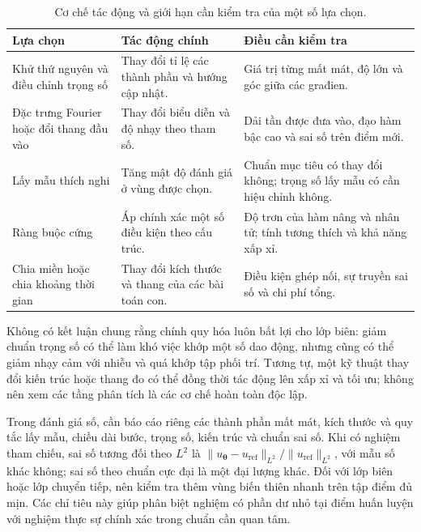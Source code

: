 \begin{table}[htbp]
\centering\small
\caption{Cơ chế tác động và giới hạn cần kiểm tra của một số lựa chọn.}
\label{p4:tab:remedies}
\begin{tabularx}{\textwidth}{@{}>{\raggedright\arraybackslash}p{}>{\raggedright\arraybackslash}X>{\raggedright\arraybackslash}X@{}}
\toprule
\textbf{Lựa chọn}&\textbf{Tác động chính}&\textbf{Điều cần kiểm tra}\\
\midrule
Khử thứ nguyên và điều chỉnh trọng số&
Thay đổi tỉ lệ các thành phần và hướng cập nhật.&
Giá trị từng mất mát, độ lớn và góc giữa các građien.\\
\addlinespace
Đặc trưng Fourier hoặc đổi thang đầu vào&
Thay đổi biểu diễn và độ nhạy theo tham số.&
Dải tần được đưa vào, đạo hàm bậc cao và sai số trên điểm mới.\\
\addlinespace
Lấy mẫu thích nghi&
Tăng mật độ đánh giá ở vùng được chọn.&
Chuẩn mục tiêu có thay đổi không; trọng số lấy mẫu có cần hiệu chỉnh không.\\
\addlinespace
Ràng buộc cứng&
Áp chính xác một số điều kiện theo cấu trúc.&
Độ trơn của hàm nâng và nhân tử; tính tương thích và khả năng xấp xỉ.\\
\addlinespace
Chia miền hoặc chia khoảng thời gian&
Thay đổi kích thước và thang của các bài toán con.&
Điều kiện ghép nối, sự truyền sai số và chi phí tổng.\\
\bottomrule
\end{tabularx}
\end{table}

Không có kết luận chung rằng chính quy hóa luôn bất lợi cho lớp
biên: giảm chuẩn trọng số có thể làm khó việc khớp một số dao động,
nhưng cũng có thể giảm nhạy cảm với nhiễu và quá khớp tập phối trí.
Tương tự, một kỹ thuật thay đổi kiến trúc hoặc thang đo có thể đồng
thời tác động lên xấp xỉ và tối ưu; không nên xem các tầng phân tích
là các cơ chế hoàn toàn độc lập.

Trong đánh giá số, cần báo cáo riêng các thành phần mất mát, kích
thước và quy tắc lấy mẫu, chiều dài bước, trọng số, kiến trúc và
chuẩn sai số. Khi có nghiệm tham chiếu, sai số tương đối theo $L^2$
là $\|u_{\boldsymbol{\theta}}-u_{\mathrm{ref}}\|_{L^2}/
\|u_{\mathrm{ref}}\|_{L^2}$, với mẫu số khác không; sai số theo chuẩn
cực đại là một đại lượng khác. Đối với lớp biên hoặc lớp chuyển tiếp,
nên kiểm tra thêm vùng biến thiên nhanh trên tập điểm đủ mịn. Các
chỉ tiêu này giúp phân biệt nghiệm có phần dư nhỏ tại điểm huấn
luyện với nghiệm thực sự chính xác trong chuẩn cần quan tâm.

